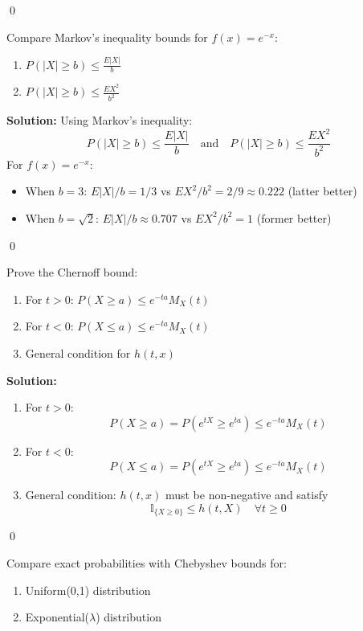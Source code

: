 \qed
\begin{problembox}
Compare Markov's inequality bounds for $f(x) = e^{-x}$:
\begin{enumerate}[label=(\alph*)]
\item $P(|X| \geq b) \leq \frac{E|X|}{b}$
\item $P(|X| \geq b) \leq \frac{EX^2}{b^2}$
\end{enumerate}
\end{problembox}

\noindent\textbf{Solution:}
Using Markov's inequality:
\[
P(|X| \geq b) \leq \frac{E|X|}{b} \quad \text{and} \quad P(|X| \geq b) \leq \frac{EX^2}{b^2}
\]
For $f(x) = e^{-x}$:
\begin{itemize}
\item When $b=3$: $E|X|/b = 1/3$ vs $EX^2/b^2 = 2/9 \approx 0.222$ (latter better)
\item When $b=\sqrt{2}$: $E|X|/b \approx 0.707$ vs $EX^2/b^2 = 1$ (former better)
\end{itemize}


\qed
\begin{problembox}
Prove the Chernoff bound:
\begin{enumerate}[label=(\alph*)]
\item For $t > 0$: $P(X \geq a) \leq e^{-ta}M_X(t)$
\item For $t < 0$: $P(X \leq a) \leq e^{-ta}M_X(t)$
\item General condition for $h(t,x)$
\end{enumerate}
\end{problembox}

\noindent\textbf{Solution:}
\begin{enumerate}[label=(\alph*)]
\item For $t > 0$:
\[
P(X \geq a) = P(e^{tX} \geq e^{ta}) \leq e^{-ta}M_X(t)
\]

\item For $t < 0$:
\[
P(X \leq a) = P(e^{tX} \geq e^{ta}) \leq e^{-ta}M_X(t)
\]

\item General condition: $h(t,x)$ must be non-negative and satisfy
\[
\mathbb{I}_{\{X \geq 0\}} \leq h(t,X) \quad \forall t \geq 0
\]
\end{enumerate}


\qed
\begin{problembox}
Compare exact probabilities with Chebyshev bounds for:
\begin{enumerate}
\item Uniform(0,1) distribution
\item Exponential($\lambda$) distribution
\end{enumerate}
\end{problembox}

